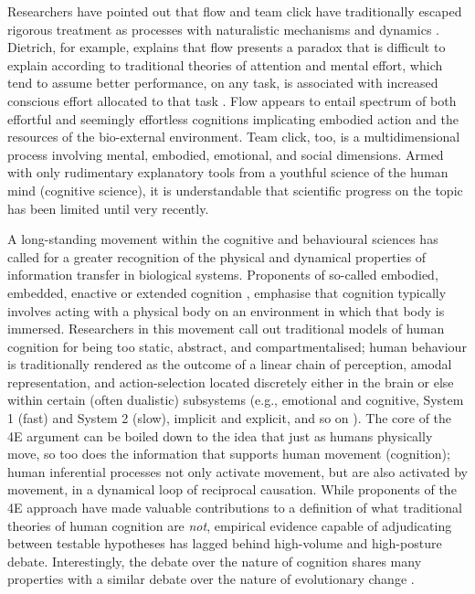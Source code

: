 \begin{CJK}{UTF8}{gbsn}
Researchers have pointed out that flow and team click have traditionally escaped rigorous treatment as processes with naturalistic mechanisms and dynamics \citep{Dietrich2010a,Slingerland2014}. Dietrich, for example, explains that flow presents a paradox that is difficult to explain according to traditional theories of attention and mental effort, which tend to assume better performance, on any task, is associated with increased conscious effort allocated to that task \citep{Dietrich2004b}.  Flow appears to entail spectrum of both effortful and seemingly effortless cognitions implicating embodied action and the resources of the bio-external environment.  Team click, too, is a multidimensional process involving mental, embodied, emotional, and social dimensions.  Armed with only rudimentary explanatory tools from a youthful science of the human mind (cognitive science), it is understandable that scientific progress on the topic has been limited until very recently.

A long-standing movement within the cognitive and behavioural sciences has called for a greater recognition of the physical and dynamical properties of information transfer in biological systems.  Proponents of so-called embodied, embedded, enactive or extended cognition \citep[now collectively referred to as ``4E cognition,'' see][]{Menary2010}, emphasise that cognition typically involves acting with a physical body on an environment in which that body is immersed. Researchers in this movement call out traditional models of human cognition for being too static, abstract, and compartmentalised; human behaviour is traditionally rendered as the outcome of a linear chain of perception, amodal representation, and action-selection located discretely either in the brain or else within certain (often dualistic) subsystems (e.g., emotional and cognitive, System 1 (fast) and System 2 (slow), implicit and explicit, and so on \citep[cf.][]{Diennes1999,Kahneman2011}).  The core of the 4E argument can be boiled down to the idea that just as humans physically move, so too does the information that supports human movement (cognition); human inferential processes not only activate movement, but are also activated by movement, in a dynamical loop of reciprocal causation.  While proponents of the 4E approach have made valuable contributions to a definition of what traditional theories of human cognition are \textit{not}, empirical evidence capable of adjudicating between testable hypotheses has lagged behind high-volume and high-posture  debate.  Interestingly, the debate over the nature of cognition shares many properties with a similar debate over the nature of evolutionary change \citep{Nowak2010,Scott-Phillips2011,Laland2014,Fuentes2016}.


\end{CJK}
